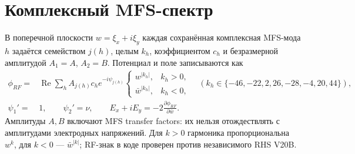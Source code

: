 \documentclass[11pt]{article}
\begin{document}
\section{Комплексный MFS-спектр}
В поперечной плоскости $w=\xi_x+i\xi_y$ каждая сохранённая комплексная MFS-мода $h$ задаётся семейством $j(h)$, целым $k_h$, коэффициентом $c_h$ и безразмерной амплитудой $A_1=A$, $A_2=B$. Потенциал и поле записываются как
\begin{align}
 \phi_{RF}={}&\operatorname{Re}\sum_h A_{j(h)}c_he^{-i\psi_{j(h)}}
 \begin{cases}w^{|k_h|},&k_h>0,\\
 \bar w^{|k_h|},&k_h<0,\end{cases}\quad
 (k_h\in\{-46,-22,2,26,-28,-4,20,44\}),\\
 \psi_1'={}&1,\qquad \psi_2'=\nu,\qquad
 E_x+iE_y=-2\frac{\partial\phi_{RF}}{\partial\bar w}.
\end{align}
Амплитуды $A,B$ включают MFS transfer factors: их нельзя отождествлять с амплитудами электродных напряжений. Для $k>0$ гармоника пропорциональна $w^k$, для $k<0$ — $\bar w^{|k|}$; RF-знак в коде проверен против независимого RHS V20B.
\end{document}
